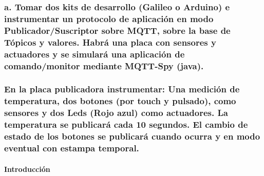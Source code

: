 \documentclass[11pt]{article}
\begin{document}
    \hypertarget{a.-tomar-dos-kits-de-desarrollo-galileo-o-arduino-e-instrumentar-un-protocolo-de-aplicaciuxf3n-en-modo-publicadorsuscriptor-sobre-mqtt-sobre-la-base-de-tuxf3picos-y-valores.-habruxe1-una-placa-con-sensores-y-actuadores-y-se-simularuxe1-una-aplicaciuxf3n-de-comandomonitor-mediante-mqtt-spy-java.}{%
\subsubsection{a. Tomar dos kits de desarrollo (Galileo o Arduino) e
instrumentar un protocolo de aplicación en modo Publicador/Suscriptor
sobre MQTT, sobre la base de Tópicos y valores. Habrá una placa con
sensores y actuadores y se simulará una aplicación de comando/monitor
mediante MQTT-Spy
(java).}\label{a.-tomar-dos-kits-de-desarrollo-galileo-o-arduino-e-instrumentar-un-protocolo-de-aplicaciuxf3n-en-modo-publicadorsuscriptor-sobre-mqtt-sobre-la-base-de-tuxf3picos-y-valores.-habruxe1-una-placa-con-sensores-y-actuadores-y-se-simularuxe1-una-aplicaciuxf3n-de-comandomonitor-mediante-mqtt-spy-java.}}

\hypertarget{en-la-placa-publicadora-instrumentar-una-mediciuxf3n-de-temperatura-dos-botones-por-touch-y-pulsado-como-sensores-y-dos-leds-rojo-azul-como-actuadores.-la-temperatura-se-publicaruxe1-cada-10-segundos.-el-cambio-de-estado-de-los-botones-se-publicaruxe1-cuando-ocurra-y-en-modo-eventual-con-estampa-temporal.}{%
\subsubsection{En la placa publicadora instrumentar: Una medición de
temperatura, dos botones (por touch y pulsado), como sensores y dos Leds
(Rojo azul) como actuadores. La temperatura se publicará cada 10
segundos. El cambio de estado de los botones se publicará cuando ocurra
y en modo eventual con estampa
temporal.}\label{en-la-placa-publicadora-instrumentar-una-mediciuxf3n-de-temperatura-dos-botones-por-touch-y-pulsado-como-sensores-y-dos-leds-rojo-azul-como-actuadores.-la-temperatura-se-publicaruxe1-cada-10-segundos.-el-cambio-de-estado-de-los-botones-se-publicaruxe1-cuando-ocurra-y-en-modo-eventual-con-estampa-temporal.}}

    \hypertarget{introducciuxf3n}{%
\paragraph{Introducción\\}\label{introducciuxf3n}}
\end{document}
